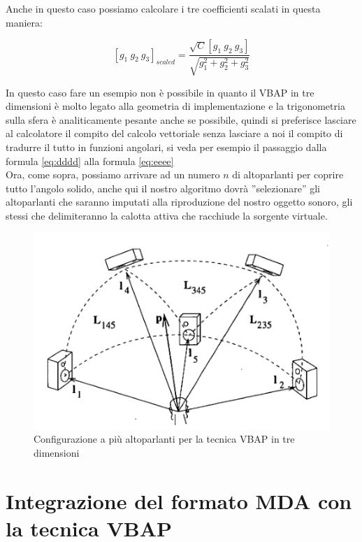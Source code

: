 \documentclass[12pt,a4paper]{report}
\begin{document}
Anche in questo caso possiamo calcolare i tre coefficienti scalati in questa maniera:

\begin{equation}
\left[g_1 \ g_2 \ g_3 \right]_{scaled} = \dfrac{\sqrt{C} \left[ g_1 \ g_2 \ g_3 \right]}{\sqrt{g_1^2 + g_2^2 + g_3^2}}
\label{iiii}
\end{equation}

In questo caso fare un esempio non è possibile in quanto il VBAP in tre dimensioni è molto legato alla geometria di implementazione e la trigonometria sulla sfera è analiticamente pesante anche se possibile, quindi si preferisce lasciare al calcolatore il compito del calcolo vettoriale senza lasciare a noi il compito di tradurre il tutto in funzioni angolari, si veda per esempio il passaggio dalla formula \ref{eq:dddd} alla formula \ref{eq:eeee}\\

Ora, come sopra, possiamo arrivare ad un numero $n$ di altoparlanti per coprire tutto l'angolo solido, anche qui il nostro algoritmo dovrà ''selezionare'' gli altoparlanti che saranno imputati alla riproduzione del nostro oggetto sonoro, gli stessi che delimiteranno la calotta attiva che racchiude la sorgente virtuale.

\begin{figure}[htbp]
	\centering
	\includegraphics[scale=0.50 ]{figures/matrix3dfull.png}
	\caption {Configurazione a più altoparlanti per la tecnica VBAP in tre dimensioni}
	\label{fig:matrix3dfull}
	\end{figure}


\section{Integrazione del formato MDA con la tecnica VBAP}
\end{document}
